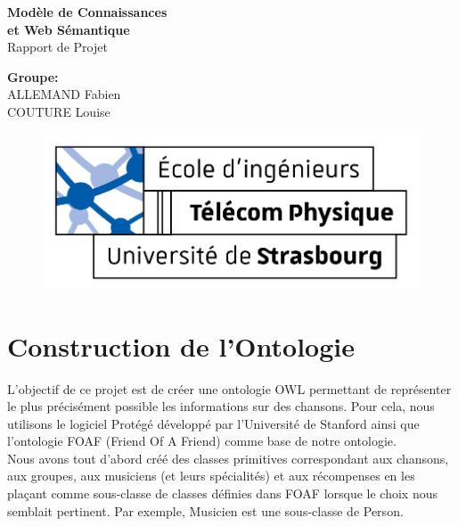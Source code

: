\documentclass{article}
\begin{document}
\thispagestyle{empty}
\addtocounter{page}{-1}
\begin{center}
	\baselineskip=50pt
	\vspace*{1cm}
	\textbf{{\Huge Modèle de Connaissances\\et Web Sémantique}}\\
	\vspace*{0.25cm}
	\textsf{{\Huge Rapport de Projet}}\\
	\vspace*{0.25cm}
	\begin{minipage}[c]{.46\linewidth}
        \centering
        \textbf{Groupe:}\\
		ALLEMAND Fabien\\
        COUTURE Louise
    \end{minipage}
\end{center}
\vspace{0.1cm}

\begin{figure}[H]
\centering
\centerline{\includegraphics[scale=2]{img/logo_TPS_2.png}}
\end{figure}

\newpage

\section{Construction de l'Ontologie}

L'objectif de ce projet est de créer une ontologie OWL permettant de représenter le plus précisément possible les informations sur des chansons. Pour cela, nous utilisons le logiciel Protégé développé par l'Université de Stanford ainsi que l'ontologie FOAF (Friend Of A Friend) comme base de notre ontologie.\\
Nous avons tout d'abord créé des classes primitives correspondant aux chansons, aux groupes, aux musiciens (et leurs spécialités) et aux récompenses en les plaçant comme sous-classe de classes définies dans FOAF lorsque le choix nous semblait pertinent. Par exemple, \textsf{Musicien} est une sous-classe de \textsf{Person}.
\end{document}
